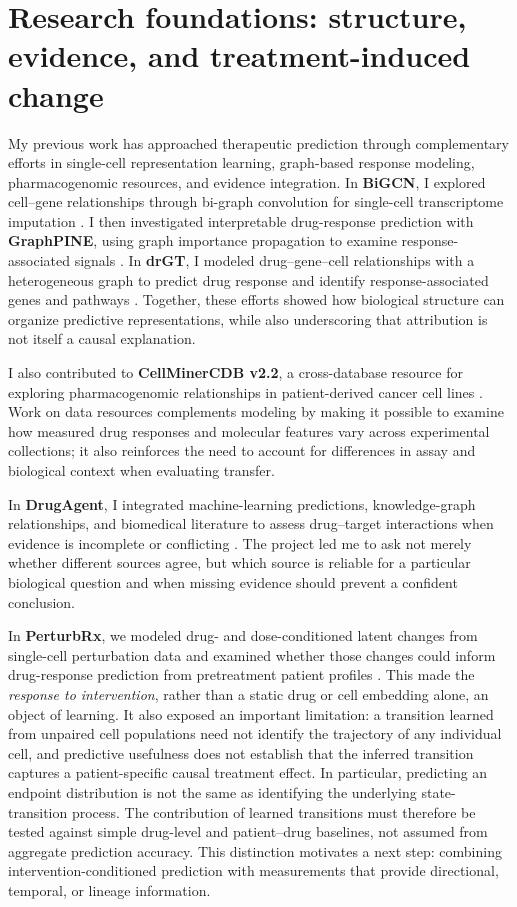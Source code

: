 \documentclass[11pt]{article}
\begin{document}
\section*{Research foundations: structure, evidence, and treatment-induced change}

My previous work has approached therapeutic prediction through complementary efforts in single-cell representation learning, graph-based response modeling, pharmacogenomic resources, and evidence integration. In \textbf{BiGCN}, I explored cell--gene relationships through bi-graph convolution for single-cell transcriptome imputation \citep{inoue2024bigcn}. I then investigated interpretable drug-response prediction with \textbf{GraphPINE}, using graph importance propagation to examine response-associated signals \citep{inoue2025graphpine}. In \textbf{drGT}, I modeled drug--gene--cell relationships with a heterogeneous graph to predict drug response and identify response-associated genes and pathways \citep{inoue2026drgt}. Together, these efforts showed how biological structure can organize predictive representations, while also underscoring that attribution is not itself a causal explanation.

I also contributed to \textbf{CellMinerCDB v2.2}, a cross-database resource for exploring pharmacogenomic relationships in patient-derived cancer cell lines \citep{elloumi2026cellminercdb}. Work on data resources complements modeling by making it possible to examine how measured drug responses and molecular features vary across experimental collections; it also reinforces the need to account for differences in assay and biological context when evaluating transfer.

In \textbf{DrugAgent}, I integrated machine-learning predictions, knowledge-graph relationships, and biomedical literature to assess drug--target interactions when evidence is incomplete or conflicting \citep{inoue2026drugagent}. The project led me to ask not merely whether different sources agree, but which source is reliable for a particular biological question and when missing evidence should prevent a confident conclusion.

In \textbf{PerturbRx}, we modeled drug- and dose-conditioned latent changes from single-cell perturbation data and examined whether those changes could inform drug-response prediction from pretreatment patient profiles \citep{inoue2026perturbrx}. This made the \emph{response to intervention}, rather than a static drug or cell embedding alone, an object of learning. It also exposed an important limitation: a transition learned from unpaired cell populations need not identify the trajectory of any individual cell, and predictive usefulness does not establish that the inferred transition captures a patient-specific causal treatment effect. In particular, predicting an endpoint distribution is not the same as identifying the underlying state-transition process. The contribution of learned transitions must therefore be tested against simple drug-level and patient--drug baselines, not assumed from aggregate prediction accuracy. This distinction motivates a next step: combining intervention-conditioned prediction with measurements that provide directional, temporal, or lineage information.
\end{document}
